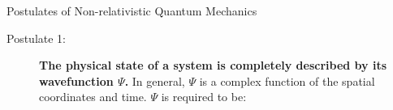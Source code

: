 \documentclass[11pt]{article}
\begin{document}
\begin{table} 
\begin{center}
    \caption{\large{Postulates of Non-relativistic Quantum Mechanics}}
   \begin{description}
    \item[Postulate 1:] {{\bf The physical state of a system is completely described by
        its wavefunction $\Psi$.}  In general, $\Psi$ is a complex function of the spatial
      coordinates and time.  $\Psi$ is required to be:}


\end{description}
\end{center}
\end{table}
\end{document}
